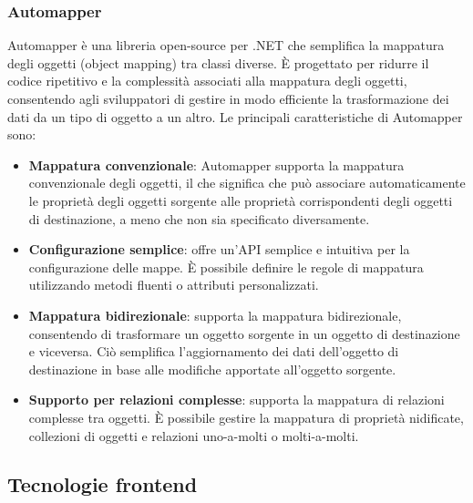 \subsubsection{Automapper}
Automapper è una libreria open-source per .NET che semplifica la mappatura degli oggetti (object mapping) tra classi diverse. È progettato per ridurre il codice ripetitivo e la complessità associati alla mappatura degli oggetti, consentendo agli sviluppatori di gestire in modo efficiente la trasformazione dei dati da un tipo di oggetto a un altro.
Le principali caratteristiche di Automapper sono:
\begin{itemize}
    \item \textbf{Mappatura convenzionale}: Automapper supporta la mappatura convenzionale degli oggetti, il che significa che può associare automaticamente le proprietà degli oggetti sorgente alle proprietà corrispondenti degli oggetti di destinazione, a meno che non sia specificato diversamente.
  \item \textbf{Configurazione semplice}: offre un'API semplice e intuitiva per la configurazione delle mappe. È possibile definire le regole di mappatura utilizzando metodi fluenti o attributi personalizzati.
  \item \textbf{Mappatura bidirezionale}: supporta la mappatura bidirezionale, consentendo di trasformare un oggetto sorgente in un oggetto di destinazione e viceversa. Ciò semplifica l'aggiornamento dei dati dell'oggetto di destinazione in base alle modifiche apportate all'oggetto sorgente.
  \item \textbf{Supporto per relazioni complesse}: supporta la mappatura di relazioni complesse tra oggetti. È possibile gestire la mappatura di proprietà nidificate, collezioni di oggetti e relazioni uno-a-molti o molti-a-molti.
\end{itemize}
\subsection{Tecnologie frontend}
